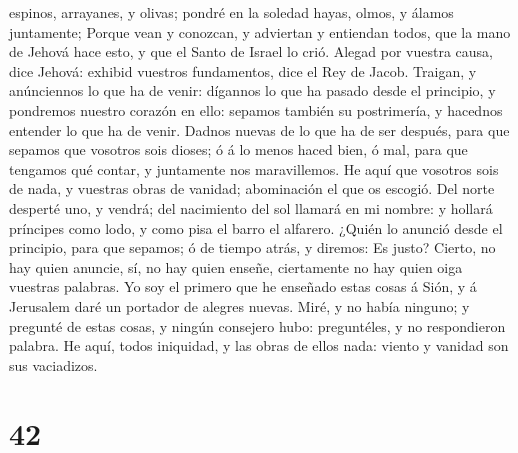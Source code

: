 espinos, arrayanes, y olivas; pondré en la soledad hayas, olmos, y
álamos juntamente;  Porque vean y conozcan, y adviertan y
entiendan todos, que la mano de Jehová hace esto, y que el Santo de
Israel lo crió.  Alegad por vuestra causa, dice Jehová:
exhibid vuestros fundamentos, dice el Rey de Jacob. 
Traigan, y anúnciennos lo que ha de venir: dígannos lo que ha pasado
desde el principio, y pondremos nuestro corazón en ello: sepamos también
su postrimería, y hacednos entender lo que ha de venir. 
Dadnos nuevas de lo que ha de ser después, para que sepamos que vosotros
sois dioses; ó á lo menos haced bien, ó mal, para que tengamos qué
contar, y juntamente nos maravillemos.  He aquí que
vosotros sois de nada, y vuestras obras de vanidad; abominación el que
os escogió.  Del norte desperté uno, y vendrá; del
nacimiento del sol llamará en mi nombre: y hollará príncipes como lodo,
y como pisa el barro el alfarero.  ¿Quién lo anunció
desde el principio, para que sepamos; ó de tiempo atrás, y diremos: Es
justo? Cierto, no hay quien anuncie, sí, no hay quien enseñe,
ciertamente no hay quien oiga vuestras palabras.  Yo soy
el primero que he enseñado estas cosas á Sión, y á Jerusalem daré un
portador de alegres nuevas.  Miré, y no había ninguno; y
pregunté de estas cosas, y ningún consejero hubo: preguntéles, y no
respondieron palabra.  He aquí, todos iniquidad, y las
obras de ellos nada: viento y vanidad son sus vaciadizos.

\hypertarget{section-41}{%
\section{42}\label{section-41}}

